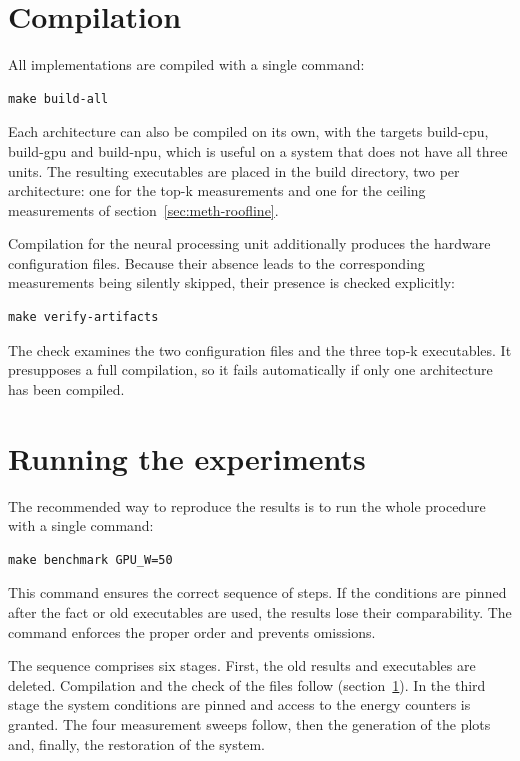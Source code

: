\section{Compilation}
\label{sec:repro-build}

All implementations are compiled with a single command:

\begin{verbatim}
make build-all
\end{verbatim}

Each architecture can also be compiled on its own, with the targets build-cpu,
build-gpu and build-npu, which is useful on a system that does not have all
three units. The resulting executables are placed in the build directory, two
per architecture: one for the top-k measurements and one for the ceiling
measurements of section~\ref{sec:meth-roofline}.

Compilation for the neural processing unit additionally produces the hardware
configuration files. Because their absence leads to the corresponding
measurements being silently skipped, their presence is checked explicitly:

\begin{verbatim}
make verify-artifacts
\end{verbatim}

The check examines the two configuration files and the three top-k executables.
It presupposes a full compilation, so it fails automatically if only one
architecture has been compiled.

\section{Running the experiments}
\label{sec:repro-run}

The recommended way to reproduce the results is to run the whole procedure with
a single command:

\begin{verbatim}
make benchmark GPU_W=50
\end{verbatim}

This command ensures the correct sequence of steps. If the conditions are
pinned after the fact or old executables are used, the results lose their
comparability. The command enforces the proper order and prevents omissions.

The sequence comprises six stages. First, the old results and executables are
deleted. Compilation and the check of the files follow
(section~\ref{sec:repro-build}). In the third stage the system conditions are
pinned and access to the energy counters is granted. The four measurement
sweeps follow, then the generation of the plots and, finally, the restoration
of the system.

